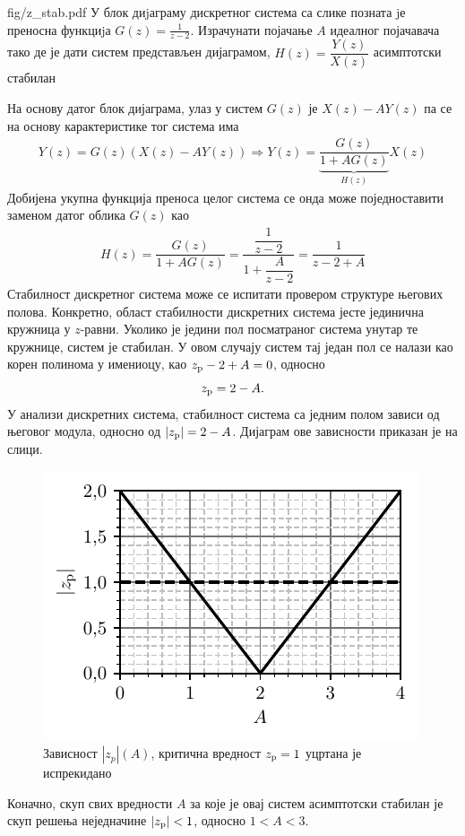 \begin{slikaDesno}{fig/z_stab.pdf}
    \PID У блок диjаграму дискретног система са слике позната jе преносна функциjа
    $G(z) = \frac{1}{z - 2}$. Израчунати појачање $A$ идеалног појачавача тако де је 
    дати систем представљен дијаграмом, $H(z) = \dfrac{Y(z)}{X(z)}$ асимптотски стабилан
\end{slikaDesno}

\RESENJE
На основу датог блок дијаграма, улаз у систем $G(z)$ је $X(z) - AY(z)$ па се на основу карактеристике тог система има 
\begin{eqnarray}
    Y(z) = G(z) \left( X(z) - AY(z) \right) \Rightarrow Y(z) = \underbrace{\dfrac{G(z)}{ 1 + AG(z) }}_{H(z)} X(z) 
\end{eqnarray}
Добијена укупна функција преноса целог система се онда може поједноставити заменом датог облика $G(z)$ као 
\begin{eqnarray}
    H(z) = \dfrac{G(z)}{ 1 + AG(z) }
         = \dfrac{\dfrac{1}{z - 2}}{1 + \dfrac{A}{z - 2}} 
         = \dfrac{1}{z - 2 + A}
\end{eqnarray}
Стабилност дискретног система може се испитати провером структуре његових полова. 
Конкретно, област стабилности дискретних система јесте јединична кружница у $z$-равни.
Уколико је једини пол посматраног система унутар те кружнице, систем је стабилан. У овом случају систем тај један пол
се налази као корен полинома у имениоцу, као $z_{\rm p} - 2 + A = 0$, односно 
\begin{equation}
    z_{\rm p} = 2-A.
\end{equation} У анализи дискретних система, стабилност система са једним полом зависи
од његовог модула, односно од $|z_{\rm p}| = 2-A$. Дијаграм ове зависности приказан је на слици. 
\begin{figure}[ht!]
    \centering
    \includegraphics{fig/z_mod.pdf}
    \caption{Зависност $|z_{p}|(A)$, критична вредност $z_{\rm p} = 1$ уцртана је испрекидано }
\end{figure}

Коначно, скуп свих вредности $A$ за које је овај систем асимптотски стабилан је скуп решења неједначине $|z_{\rm p}|<1$, односно 
$1 < A < 3$. 
